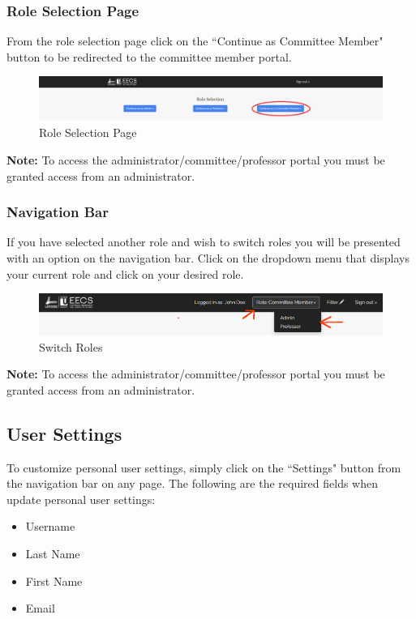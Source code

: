 \documentclass[fontsize=12pt,paper=letter,twoside]{scrartcl}
\begin{document}
\subsubsection{Role Selection Page}
From the role selection page click on the ``Continue as Committee Member" button to be redirected to the committee member portal.

\begin{figure}[!htb]
\begin{center}
\includegraphics[width=.99\textwidth]{images/auth.png}
\end{center}
\caption{Role Selection Page}
\label{fig:role_selection1}
\end{figure}

\noindent \textbf{Note:} To access the administrator/committee/professor portal you must be granted access from an administrator.

\subsubsection{Navigation Bar}
If you have selected another role and wish to switch roles you will be presented with an option on the navigation bar. Click on the dropdown menu that displays your current role and click on your desired role.
\begin{figure}[!htb]
\begin{center}
\includegraphics[width=.99\textwidth]{images/role-selection2.png}
\end{center}
\caption{Switch Roles}
\label{fig:role_selection2}
\end{figure}

\noindent \textbf{Note:} To access the administrator/committee/professor portal you must be granted access from an administrator.

\subsection{User Settings}
To customize personal user settings, simply click on the ``Settings" button from the navigation bar on any page. The following are the required fields when update personal user settings:
\begin{itemize}
\item Username
\item Last Name
\item First Name
\item Email
\end{itemize}
\end{document}
